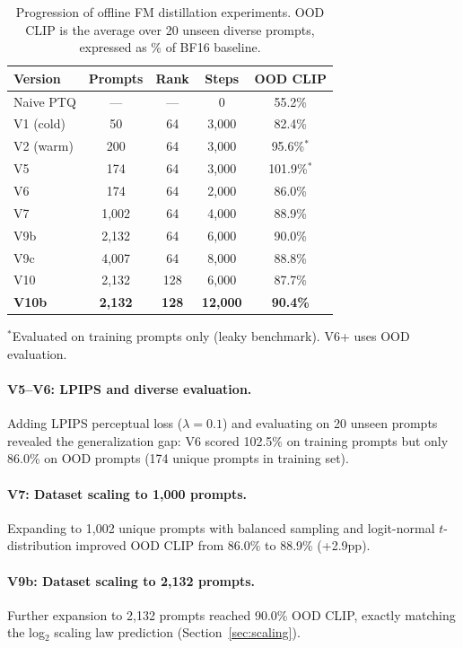 \documentclass[10pt,twocolumn]{article}
\begin{document}
\begin{table}[t]
\centering
\caption{Progression of offline FM distillation experiments. OOD CLIP is the average over 20 unseen diverse prompts, expressed as \% of BF16 baseline.}
\label{tab:main}
\small
\begin{tabular}{lcccc}
\toprule
\textbf{Version} & \textbf{Prompts} & \textbf{Rank} & \textbf{Steps} & \textbf{OOD CLIP} \\
\midrule
Naive PTQ & --- & --- & 0 & 55.2\% \\
V1 (cold) & 50 & 64 & 3{,}000 & 82.4\% \\
V2 (warm) & 200 & 64 & 3{,}000 & 95.6\%$^*$ \\
V5 & 174 & 64 & 3{,}000 & 101.9\%$^*$ \\
\midrule
V6 & 174 & 64 & 2{,}000 & 86.0\% \\
V7 & 1{,}002 & 64 & 4{,}000 & 88.9\% \\
V9b & 2{,}132 & 64 & 6{,}000 & 90.0\% \\
V9c & 4{,}007 & 64 & 8{,}000 & 88.8\% \\
\midrule
V10 & 2{,}132 & 128 & 6{,}000 & 87.7\% \\
\textbf{V10b} & \textbf{2{,}132} & \textbf{128} & \textbf{12{,}000} & \textbf{90.4\%} \\
\bottomrule
\end{tabular}
\vspace{2pt}
{\footnotesize $^*$Evaluated on training prompts only (leaky benchmark). V6+ uses OOD evaluation.}
\end{table}

\paragraph{V5--V6: LPIPS and diverse evaluation.}
Adding LPIPS perceptual loss ($\lambda=0.1$) and evaluating on 20 unseen prompts revealed the generalization gap: V6 scored 102.5\% on training prompts but only 86.0\% on OOD prompts (174 unique prompts in training set).

\paragraph{V7: Dataset scaling to 1{,}000 prompts.}
Expanding to 1{,}002 unique prompts with balanced sampling and logit-normal $t$-distribution improved OOD CLIP from 86.0\% to 88.9\% (+2.9pp).

\paragraph{V9b: Dataset scaling to 2{,}132 prompts.}
Further expansion to 2{,}132 prompts reached 90.0\% OOD CLIP, exactly matching the log$_2$ scaling law prediction (Section~\ref{sec:scaling}).
\end{document}
